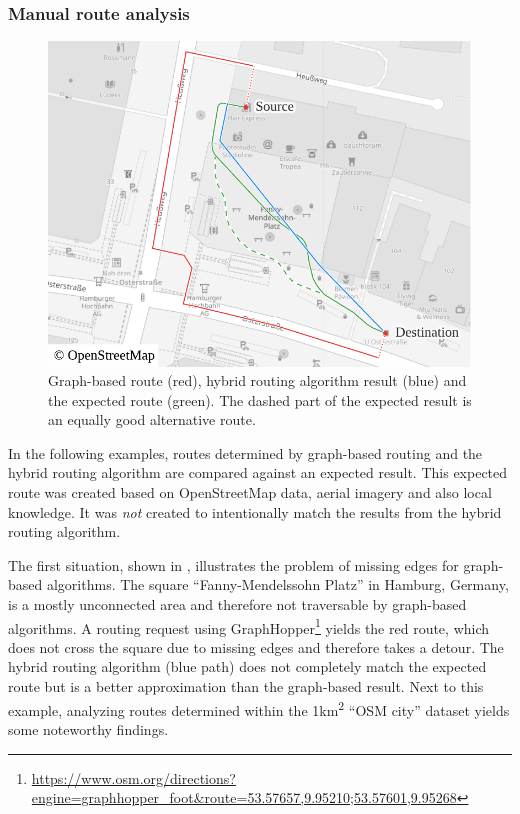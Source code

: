 		\subsubsection{Manual route analysis}
		\label{subsubsec:manual-route-analysis}
		
			\begin{figure}
				\vspace{-2.5\baselineskip}
				\begin{figcenter}
					\includegraphics[width=\linewidth]{images/qgis-routing-osterstrasse}
				\end{figcenter}
				\caption[Comparison of normal routing with hybrid visibility routing.]{Graph-based route (red), hybrid routing algorithm result (blue) and the expected route (green). The dashed part of the expected result is an equally good alternative route.}
				\label{fig:eval-osterstrasse}
			\end{figure}
		
			In the following examples, routes determined by graph-based routing and the hybrid routing algorithm are compared against an expected result.
			This expected route was created based on OpenStreetMap data, aerial imagery and also local knowledge.
			It was \emph{not} created to intentionally match the results from the hybrid routing algorithm.
		
			The first situation, shown in , illustrates the problem of missing edges for graph-based algorithms.
			The square \enquote{Fanny-Mendelssohn Platz} in Hamburg, Germany, is a mostly unconnected area and therefore not traversable by graph-based algorithms.
			A routing request using GraphHopper\footnote{\url{https://www.osm.org/directions?engine=graphhopper\_foot\&route=53.57657,9.95210;53.57601,9.95268}} yields the red route, which does not cross the square due to missing edges and therefore takes a detour.
			The hybrid routing algorithm (blue path) does not completely match the expected route but is a better approximation than the graph-based result.
			Next to this example, analyzing routes determined within the 1km\textsuperscript{2} \enquote{OSM city} dataset yields some noteworthy findings.
			

